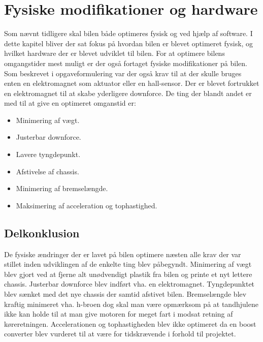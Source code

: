 
\section{Fysiske modifikationer og hardware}
Som nævnt tidligere skal bilen både optimeres fysisk og ved hjælp af software. I dette kapitel bliver der sat fokus på hvordan bilen er blevet optimeret fysisk, og hvilket hardware der er blevet udviklet til bilen. 
For at optimere bilens omgangstider mest muligt er der også fortaget fysiske modifikationer på bilen. Som beskrevet i opgaveformulering var der også krav til at der skulle bruges enten en elektromagnet som aktuator eller en hall-sensor. Der er blevet fortrukket en elektromagnet til at skabe yderligere downforce. De ting der blandt andet er med til at give en optimeret omganstid er:
\begin{itemize}
\item Minimering af vægt.
\item Justerbar downforce.
\item Lavere tyngdepunkt.
\item Afstivelse af chassis.
\item Minimering af bremselængde.
\item Maksimering af acceleration og tophastighed.
\end{itemize}






\subsection{Delkonklusion}
De fysiske ændringer der er lavet på bilen optimere næsten alle krav der var stillet inden udviklingen af de enkelte ting blev påbegyndt. Minimering af vægt blev gjort ved at fjerne alt unødvendigt plastik fra bilen og printe et nyt lettere chassis. Justerbar downforce blev indført vha. en elektromagnet. Tyngdepunktet blev sænket med det nye chassis der samtid afstivet bilen. Bremselængde blev kraftig minimeret vha. h-broen dog skal man være opmærksom på at tandhjulene ikke kan holde til at man give motoren for meget fart i modsat retning af køreretningen. Accelerationen og tophastigheden blev ikke optimeret da en boost converter blev vurderet til at være for tidskrævende i forhold til projektet.